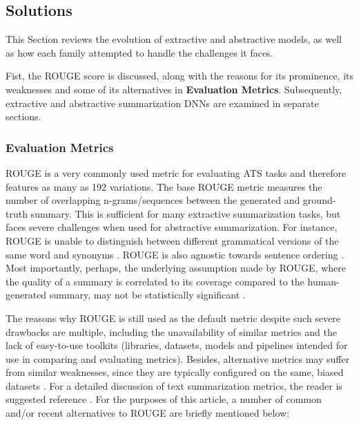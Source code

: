 \documentclass[preprint,review,12pt]{elsarticle}
\begin{document}
	
\subsection{Solutions}
This Section reviews the evolution of extractive and abstractive models, as well as how each family attempted to handle the challenges it faces.

Fist, the ROUGE score is discussed, along with the reasons for its prominence, its weaknesses and some of its alternatives in \textbf{Evaluation Metrics}. Subsequently, extractive and abstractive summarization DNNs are examined in separate sections.
    

\subsubsection{Evaluation Metrics}
ROUGE is a very commonly used metric for evaluating ATS tasks and therefore features as many as 192 variations. The base ROUGE metric \cite{rouge} measures the number of overlapping n-grams/sequences between the generated and ground-truth summary. This is sufficient for many extractive summarization tasks, but faces severe challenges when used for abstractive summarization. For instance, ROUGE is unable to distinguish between different grammatical versions of the same word \cite{suleiman} and synonyms \cite{akter}. ROUGE is also agnostic towards sentence ordering \cite{graham}. Most importantly, perhaps, the underlying assumption made by ROUGE, where the quality of a summary is correlated to its coverage compared to the human-generated summary, may not be statistically significant \cite{pitler}.

The reasons why ROUGE is still used as the default metric despite such severe drawbacks are multiple, including the unavailability of similar metrics and the lack of easy-to-use toolkits \cite{fabbri} (libraries, datasets, models and pipelines intended for use in comparing and evaluating metrics). Besides, alternative metrics may suffer from similar weaknesses, since they are typically configured on the same, biased datasets \cite{kryscinski}. For a detailed discussion of text summarization metrics, the reader is suggested reference \citet{fabbri}. For the purposes of this article, a number of common and/or recent alternatives to ROUGE are briefly mentioned below:
\end{document}
